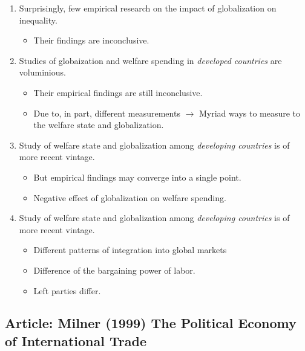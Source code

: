 \documentclass[
]{book}
\providecommand{\tightlist}{%
  \setlength{\itemsep}{0pt}\setlength{\parskip}{0pt}}
\begin{document}
\begin{enumerate}
\def\labelenumi{\arabic{enumi}.}
\item
  Surprisingly, few empirical research on the impact of globalization on inequality.

  \begin{itemize}
  \tightlist
  \item
    Their findings are inconclusive.
  \end{itemize}
\item
  Studies of globaization and welfare spending in \emph{developed countries} are voluminious.

  \begin{itemize}
  \item
    Their empirical findings are still inconclusive.
  \item
    Due to, in part, different measurements \(\rightarrow\) Myriad ways to measure to the welfare state and globalization.
  \end{itemize}
\item
  Study of welfare state and globalization among \emph{developing countries} is of more recent vintage.

  \begin{itemize}
  \item
    But empirical findings may converge into a single point.
  \item
    Negative effect of globalization on welfare spending.
  \end{itemize}
\item
  Study of welfare state and globalization among \emph{developing countries} is of more recent vintage.

  \begin{itemize}
  \item
    Different patterns of integration into global markets
  \item
    Difference of the bargaining power of labor.
  \item
    Left parties differ.
  \end{itemize}
\end{enumerate}

\hypertarget{article-milner-1999-the-political-economy-of-international-trade}{%
\subsection{Article: Milner (1999) The Political Economy of International Trade}\label{article-milner-1999-the-political-economy-of-international-trade}}
\end{document}
